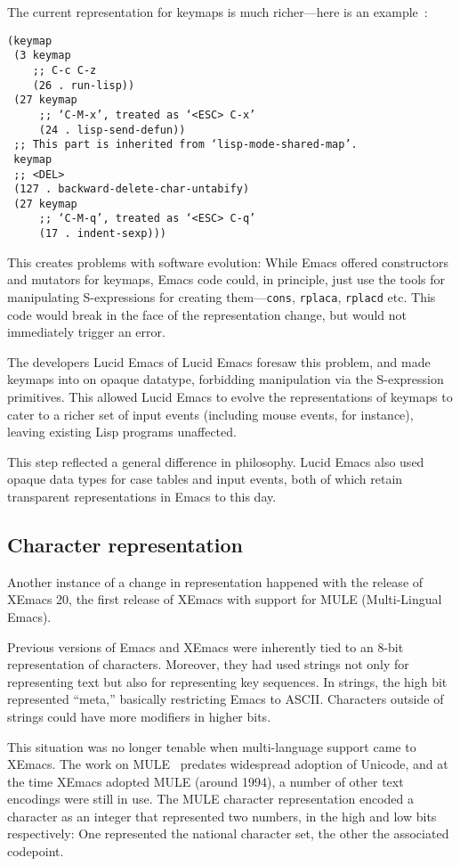 \documentclass[format=acmsmall, review=false, screen=true]{acmart}
\begin{document}
The current representation for keymaps is much richer---here is an
example~\cite{ELispManual2018}:
%
\begin{verbatim}
(keymap
 (3 keymap
    ;; C-c C-z
    (26 . run-lisp))
 (27 keymap
     ;; ‘C-M-x’, treated as ‘<ESC> C-x’
     (24 . lisp-send-defun))
 ;; This part is inherited from ‘lisp-mode-shared-map’.
 keymap
 ;; <DEL>
 (127 . backward-delete-char-untabify)
 (27 keymap
     ;; ‘C-M-q’, treated as ‘<ESC> C-q’
     (17 . indent-sexp)))
\end{verbatim}
%
This creates problems with software evolution: While Emacs offered
constructors and mutators for keymaps, Emacs code could, in principle,
just use the tools for manipulating S-expressions for creating
them---\texttt{cons}, \texttt{rplaca}, \texttt{rplacd} etc.  This code
would break in the face of the representation change, but would not
immediately trigger an error.

The developers Lucid Emacs of Lucid Emacs foresaw this problem, and
made keymaps into on opaque datatype, forbidding manipulation via the
S-expression primitives.  This allowed Lucid Emacs to evolve the
representations of keymaps to cater to a richer set of input events
(including mouse events, for instance), leaving existing Lisp programs
unaffected.

This step reflected a general difference in philosophy.  Lucid Emacs
also used opaque data types for case tables and input events, both of
which retain transparent representations in Emacs to this day.

\subsection{Character representation}

Another instance of a change in representation happened with the
release of XEmacs 20, the first release of XEmacs with support for
MULE (Multi-Lingual Emacs).

Previous versions of Emacs and XEmacs were inherently tied to an 8-bit
representation of characters.  Moreover, they had used strings not
only for representing text but also for representing key sequences.
In strings, the high bit represented ``meta,'' basically restricting
Emacs to ASCII.  Characters outside of strings could have more
modifiers in higher bits.

This situation was no longer tenable when multi-language support came
to XEmacs.  The work on MULE~\cite{Ohmaki2002} predates widespread
adoption of Unicode, and at the time XEmacs adopted MULE (around
1994), a number of other text encodings were still in use.  The MULE
character representation encoded a character as an integer that
represented two numbers, in the high and low bits respectively: One
represented the national character set, the other the associated
codepoint.
\end{document}
